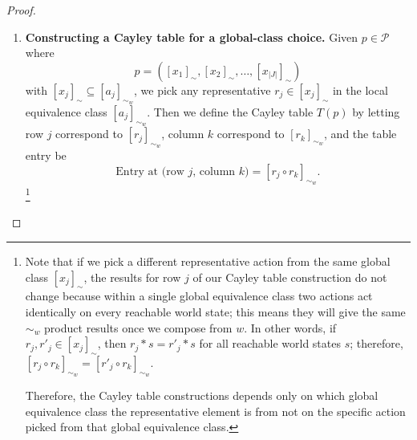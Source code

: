 \begin{proof}
\begin{enumerate}[(1)]
    \item \textbf{Constructing a Cayley table for a global-class choice.}
    Given $p \in \mathcal{P}$ where
    \begin{equation}
        p = ([x_{1}]_{\sim}, [x_{2}]_{\sim}, \dots , [x_{|J|}]_{\sim})
    \end{equation}
    with $[x_{j}]_{\sim} \subseteq [a_{j}]_{\sim_{w}}$, we pick any representative $r_{j} \in [x_{j}]_{\sim}$ in the local equivalence class $[a_{j}]_{\sim_{w}}$.
    Then we define the Cayley table $T(p)$ by letting row $j$ correspond to $[r_{j}]_{\sim_{w}}$, column $k$ correspond to $[r_{k}]_{\sim_{w}}$, and the table entry be
    \begin{equation}
        \text{Entry at (row $j$, column $k$)} = [r_{j} \circ r_{k}]_{\sim_{w}}.
    \end{equation}
    \footnote{
    Note that if we pick a different representative action from the same global class $[x_{j}]_{\sim}$, the results for row $j$ of our Cayley table construction do not change because within a single global equivalence class two actions act identically on every reachable world state; this means they will give the same $\sim_{w}$ product results once we compose from $w$.
    In other words, if $r_{j}, r'_{j} \in [x_{j}]_{\sim}$, then $r_{j} \ast s = r'_{j} \ast s$ for all reachable world states $s$; therefore, $[r_{j} \circ r_{k}]_{\sim_{w}} = [r'_{j} \circ r_{k}]_{\sim_{w}}$.
    
    Therefore, the Cayley table constructions depends only on which global equivalence class the representative element is from not on the specific action picked from that global equivalence class.
    }


\end{enumerate}
\end{proof}
